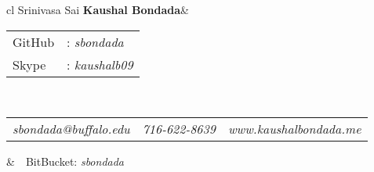 \documentclass[10pt,a4paper,oneside]{article}
\begin{document}
    \begin{center}
        \begin{tabular}{cl}
            {\Huge \textmd{Srinivasa Sai} \textbf{Kaushal Bondada}}&\begin{tabular}{ll}
                                                                        \textcolor{light-gray}{GitHub}&: \textit{sbondada}\\[0.1cm]
                                                                        \textcolor{light-gray}{Skype}&: \textit{kaushalb09}
                                                                    \end{tabular}\\[0.4cm]
            \begin{tabular}{c|c|c}
                \textit{sbondada@buffalo.edu}&\textit{716-622-8639}&\textit{www.kaushalbondada.me} 
            \end{tabular}                                          &\ \ \textcolor{light-gray}{BitBucket}: \textit{sbondada}
        \end{tabular}\\[0.6cm]
        \textcolor{light-gray}{\hrulefill} 
    \end{center} 
    \vspace{0pt}
\end{document}

